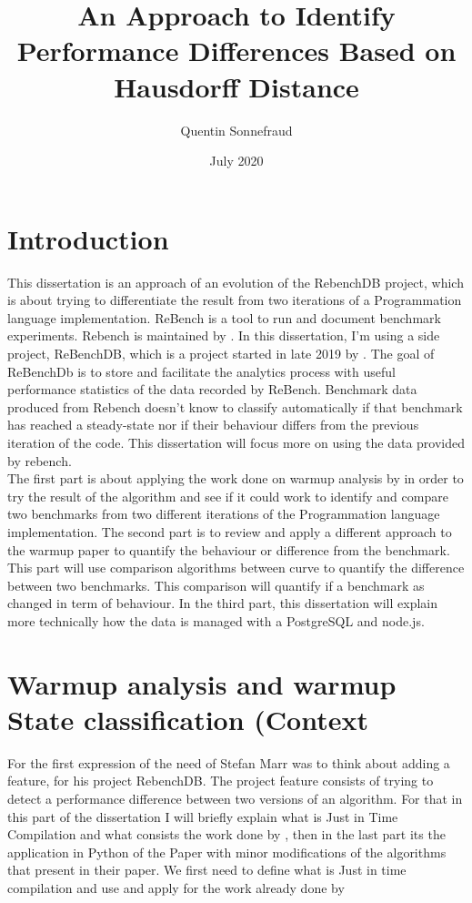 \documentclass{article}
\title{An Approach to Identify Performance Differences Based on Hausdorff Distance}
\author{Quentin Sonnefraud}
\date{July 2020}
\begin{document}
\maketitle

\tableofcontents

\section{Introduction}

This dissertation is an approach of an evolution of the RebenchDB project, which is about trying to differentiate the result from two iterations of a Programmation language implementation. 
ReBench is a tool to run and document benchmark experiments. Rebench is maintained by \cite{ReBench:2018}. In this dissertation, I'm using a side project, ReBenchDB, which is a project started in late 2019 by \cite{ReBench:2018}. The goal of ReBenchDb is to store and facilitate the analytics process with useful performance statistics of the data recorded by ReBench. Benchmark data produced from Rebench doesn't know to classify automatically if that benchmark has reached a steady-state nor if their behaviour differs from the previous iteration of the code. This dissertation will focus more on using the data provided by rebench. \\ 
The first part is about applying the work done on warmup analysis by \cite{barrett2017virtual} in order to try the result of the algorithm and see if it could work to identify and compare two benchmarks from two different iterations of the Programmation language implementation.
The second part is to review and apply a different approach to the warmup paper to quantify the behaviour or difference from the benchmark. This part will use comparison algorithms between curve to quantify the difference between two benchmarks. This comparison will quantify if a benchmark as changed in term of behaviour. In the third part, this dissertation will explain more technically how the data is managed with a PostgreSQL and node.js.\\


\section{Warmup analysis and warmup State classification (Context}

For the first expression of the need of Stefan Marr was to think about adding a feature, for his project RebenchDB. The project feature consists of trying to detect a performance difference between two versions of an algorithm. For that in this part of the dissertation I will briefly explain what is Just in Time Compilation and what consists the work done by \cite{barrett2017virtual}, then in the last part its the application in Python of the Paper with minor modifications of the algorithms that \cite{barrett2017virtual} present in their paper. We first need to define what is Just in time compilation and use and apply for the work already done by \cite{barrett2017virtual}
\end{document}
